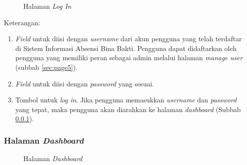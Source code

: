 \begin{figure}[H]
	\centering
	\caption{Halaman \textit{Log In}}
	\label{fig:page1}
\end{figure}	

Keterangan:
\begin{enumerate}
	\item \textit{Field} untuk diisi dengan \textit{username} dari akun pengguna yang telah terdaftar di Sistem Informasi Absensi Bina Bakti. Pengguna dapat didaftarkan oleh pengguna yang memiliki peran sebagai admin melalui halaman \textit{manage user} (subbab \ref{sec:page5}).
	\item \textit{Field} untuk diisi dengan \textit{password} yang sesuai.
	\item Tombol untuk \textit{log in}. Jika pengguna memasukkan \textit{username} dan \textit{password} yang tepat, maka pengguna akan diarahkan ke halaman \textit{dashboard} (Subbab \ref{sec:page2}).
\end{enumerate}


\subsubsection{Halaman \textit{Dashboard}}
\label{sec:page2}

\begin{figure}[H]
	\centering
	\caption{Halaman \textit{Dashboard}}
	\label{fig:page2}
\end{figure}	

